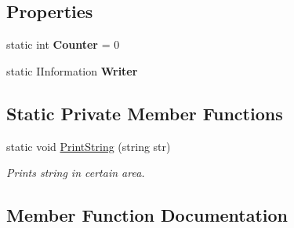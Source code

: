 \subsection*{Properties}
\begin{DoxyCompactItemize}
\item 
\mbox{\label{class_home_work_1_1_task_library_1_1_tasks_1_1_lesson6_1_1_task1_1_1_classes_1_1_u_i_part_a560cd37d985fe41a80f9d77e1deae488}} 
static int {\bfseries Counter} = 0
\item 
\mbox{\label{class_home_work_1_1_task_library_1_1_tasks_1_1_lesson6_1_1_task1_1_1_classes_1_1_u_i_part_adf940822aec0d2c1eba43465c1fdb4ea}} 
static I\+Information {\bfseries Writer}
\end{DoxyCompactItemize}
\subsection*{Static Private Member Functions}
\begin{DoxyCompactItemize}
\item 
static void \mbox{\hyperlink{class_home_work_1_1_task_library_1_1_tasks_1_1_lesson6_1_1_task1_1_1_classes_1_1_u_i_part_ac320d526807cfca3c3aa7f9c63518eb7}{Print\+String}} (string str)
\begin{DoxyCompactList}\small\item\em Prints string in certain area. \end{DoxyCompactList}\end{DoxyCompactItemize}


\subsection{Member Function Documentation}
\mbox{\label{class_home_work_1_1_task_library_1_1_tasks_1_1_lesson6_1_1_task1_1_1_classes_1_1_u_i_part_a3cb4ce1df6731cc8f25445572f237357}} 
